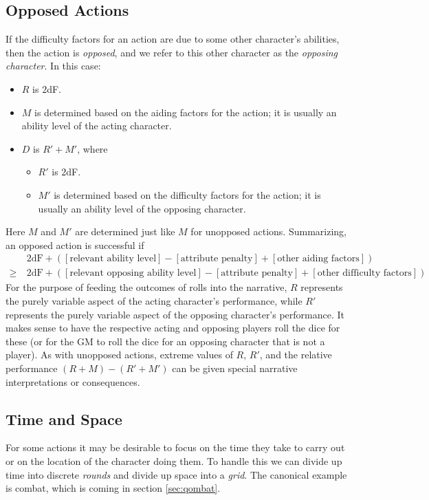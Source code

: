 \documentclass[12pt]{article}
\begin{document}
\subsection{Opposed Actions}\label{sec:opposed}
If the difficulty factors for an action are due to some other character's abilities,
then the action is \emph{opposed}, and we refer to this other character as the \emph{opposing character}.
In this case:
\vspace{-1em}
\begin{itemize}
\item $R$ is $2$dF.
\item $M$ is determined based on the aiding factors for the action; it is usually an ability level of the acting character.
\item $D$ is $R' + M'$, where
\begin{itemize}
\item $R'$ is $2$dF.
\item $M'$ is determined based on the difficulty factors for the action; it is usually an ability level of the opposing character.
\end{itemize}
\end{itemize}
Here $M$ and $M'$ are determined just like $M$ for unopposed actions.
Summarizing, an opposed action is successful if
\begin{align*}
&2\text{dF}
+([\text{relevant ability level}]
-[\text{attribute penalty}]
+[\text{other aiding factors}])\\
\geq\ & 
2\text{dF}
+([\text{relevant opposing ability level}]
-[\text{attribute penalty}]
+[\text{other difficulty factors}]).
\end{align*}
For the purpose of feeding the outcomes of rolls into the narrative,
$R$ represents the purely variable aspect of the acting character's performance,
while $R'$ represents the purely variable aspect of the opposing character's performance.
It makes sense to have the respective acting and opposing players roll the dice for these (or for the GM to roll the dice for an opposing character that is not a player).
As with unopposed actions, extreme values of $R$, $R'$,
and the relative performance $(R+M)-(R'+M')$
can be given special narrative interpretations or consequences.


\subsection{Time and Space}

For some actions it may be desirable to focus on the time they take to carry out
or on the location of the character doing them.
To handle this we can divide up time into discrete \emph{rounds} and divide up space into a \emph{grid}.
The canonical example is combat, which is coming in section \ref{sec:qombat}.
\end{document}
